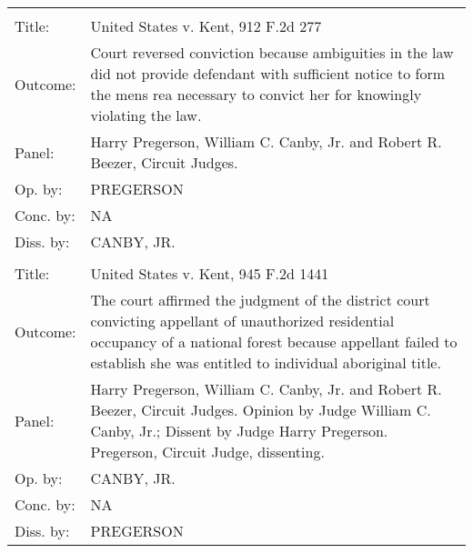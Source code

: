 \documentclass[10pt, letterpaper]{article}
\begin{document}
\begin{spacing}{1.0}
\begin{footnotesize}
\begin{longtable}[H]{lp{6in}}
        \arrayrulecolor{black}\hline\\[-4pt]
        Title: & United States v. Kent, 912 F.2d 277\\[2pt]
        Outcome: & Court reversed conviction because ambiguities in the law did not provide defendant with sufficient notice to form the mens rea necessary to convict her for knowingly violating the law.\\[2pt]
        Panel: &  Harry Pregerson, William C. Canby, Jr. and Robert R. Beezer, Circuit Judges.  \\[2pt]
        Op. by: & PREGERSON \\[2pt]
        Conc. by: & NA\\[2pt]
        Diss. by: & CANBY, JR.  \\[2pt]
        \arrayrulecolor{gray}\hline\\[-4pt]
        Title: & United States v. Kent, 945 F.2d 1441\\[2pt]
        Outcome: & The court affirmed the judgment of the district court convicting appellant of unauthorized residential occupancy of a national forest because appellant failed to establish she was entitled to individual aboriginal title.\\[2pt]
        Panel: &  Harry Pregerson, William C. Canby, Jr. and Robert R. Beezer, Circuit Judges. Opinion by Judge William C. Canby, Jr.; Dissent by Judge Harry Pregerson.  Pregerson, Circuit Judge, dissenting.  \\[2pt]
        Op. by: & CANBY, JR.  \\[2pt]
        Conc. by: & NA\\[2pt]
        Diss. by: & PREGERSON \\[2pt]
        

\end{longtable}
\end{footnotesize}
\end{spacing}
\end{document}
